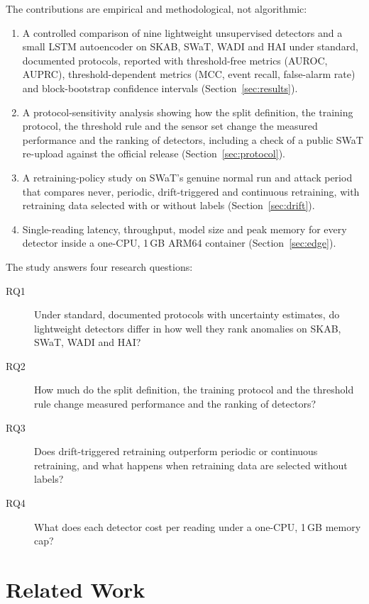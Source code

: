 \documentclass[11pt]{article}
\begin{document}
The contributions are empirical and methodological, not algorithmic:
\begin{enumerate}
\item A controlled comparison of nine lightweight unsupervised detectors and a
small LSTM autoencoder on SKAB, SWaT, WADI and HAI under standard, documented protocols,
reported with threshold-free metrics (AUROC, AUPRC), threshold-dependent
metrics (MCC, event recall, false-alarm rate) and block-bootstrap confidence
intervals (Section~\ref{sec:results}).
\item A protocol-sensitivity analysis showing how the split definition, the
training protocol, the threshold rule and the sensor set change the measured
performance and the ranking of detectors, including a check of a public SWaT re-upload
against the official release (Section~\ref{sec:protocol}).
\item A retraining-policy study on SWaT's genuine normal run and attack period
that compares never, periodic, drift-triggered and continuous retraining, with
retraining data selected with or without labels (Section~\ref{sec:drift}).
\item Single-reading latency, throughput, model size and peak memory for every
detector inside a one-CPU, 1\,GB ARM64 container (Section~\ref{sec:edge}).
\end{enumerate}

The study answers four research questions:
\begin{description}
\item[RQ1] Under standard, documented protocols with uncertainty estimates, do
lightweight detectors differ in how well they rank anomalies on SKAB, SWaT, WADI and HAI?
\item[RQ2] How much do the split definition, the training protocol and the
threshold rule change measured performance and the ranking of detectors?
\item[RQ3] Does drift-triggered retraining outperform periodic or continuous
retraining, and what happens when retraining data are selected without labels?
\item[RQ4] What does each detector cost per reading under a one-CPU, 1\,GB
memory cap?
\end{description}

\section{Related Work}
\label{sec:related}
\end{document}
